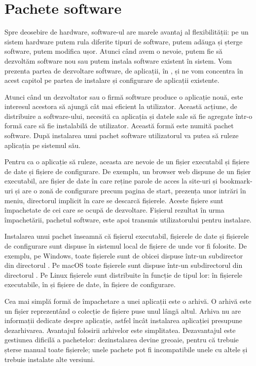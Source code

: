 \chapter{Pachete software}
\label{ch:package}

Spre deosebire de hardware, software-ul are marele avantaj al flexibilității: pe un sistem hardware putem rula diferite tipuri de software, putem adăuga și șterge software, putem modifica ușor. Atunci când avem o nevoie, putem fie să dezvoltăm software nou sau putem instala software existent în sistem. Vom prezenta partea de dezvoltare software, de aplicații, în , și ne vom concentra în acest capitol pe partea de instalare și configurare de aplicații existente.

Atunci când un dezvoltator sau o firmă software produce o aplicație nouă, este interesul acestora să ajungă cât mai eficient la utilizator. Această acțiune, de distribuire a software-ului, necesită ca aplicația și datele sale să fie agregate într-o formă care să fie instalabilă de utilizator. Această formă este numită pachet software. După instalarea unui pachet software utilizatorul va putea să ruleze aplicația pe sistemul său.

Pentru ca o aplicație să ruleze, aceasta are nevoie de un fișier executabil și fișiere de date și fișiere de configurare. De exemplu, un browser web dispune de un fișier executabil, are fișier de date în care reține parole de acces la site-uri și bookmark-uri și are o zonă de configurare precum pagina de start, prezența unor intrări în meniu, directorul implicit în care se descarcă fișierele. Aceste fișiere sunt împachetate de cei care se ocupă de dezvoltare. Fișierul rezultat în urma împachetării, pachetul software, este apoi transmis utilizatorului pentru instalare.

Instalarea unui pachet înseamnă că fișierul executabil, fișierele de date și fișierele de configurare sunt dispuse în sistemul local de fișiere de unde vor fi folosite. De exemplu, pe Windows, toate fișierele sunt de obicei dispuse într-un subdirector din directorul . Pe macOS toate fișierele sunt dispuse într-un subdirectorul din directorul . Pe Linux fișierele sunt distribuite în funcție de tipul lor: în  fișierele executabile, în  și  fișiere de date, în  fișiere de configurare.

Cea mai simplă formă de împachetare a unei aplicații este o arhivă. O arhivă este un fișier reprezentând o colecție de fișiere puse unul lângă altul. Arhiva nu are informații dedicate despre aplicație, astfel încât instalarea aplicației presupune dezarhivarea. Avantajul folosirii arhivelor este simplitatea. Dezavantajul este gestiunea dificilă a pachetelor: dezinstalarea devine greoaie, pentru că trebuie șterse manual toate fișierele; unele pachete pot fi incompatibile unele cu altele și trebuie instalate alte versiuni.

